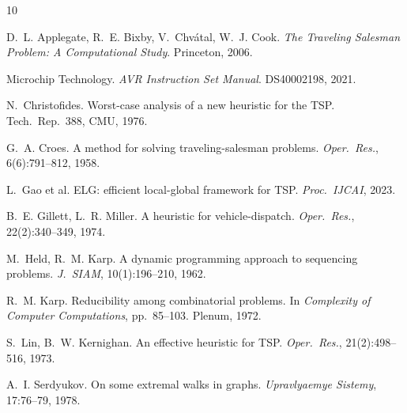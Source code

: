 \documentclass[11pt,a4paper,twocolumn]{article}
\begin{document}

\begin{thebibliography}{10}

D.~L. Applegate, R.~E. Bixby, V.~Chv\'{a}tal, W.~J. Cook.
\textit{The Traveling Salesman Problem: A Computational Study}. Princeton, 2006.

Microchip Technology. \textit{AVR Instruction Set Manual}. DS40002198, 2021.

N.~Christofides. Worst-case analysis of a new heuristic for the TSP.
Tech.\ Rep.\ 388, CMU, 1976.

G.~A. Croes. A method for solving traveling-salesman problems.
\textit{Oper.\ Res.}, 6(6):791--812, 1958.

L.~Gao et al. ELG: efficient local-global framework for TSP.
\textit{Proc.\ IJCAI}, 2023.

B.~E. Gillett, L.~R. Miller. A heuristic for vehicle-dispatch.
\textit{Oper.\ Res.}, 22(2):340--349, 1974.

M.~Held, R.~M. Karp. A dynamic programming approach to sequencing problems.
\textit{J.\ SIAM}, 10(1):196--210, 1962.

R.~M. Karp. Reducibility among combinatorial problems.
In \textit{Complexity of Computer Computations}, pp.~85--103. Plenum, 1972.

S.~Lin, B.~W. Kernighan. An effective heuristic for TSP.
\textit{Oper.\ Res.}, 21(2):498--516, 1973.

A.~I. Serdyukov. On some extremal walks in graphs.
\textit{Upravlyaemye Sistemy}, 17:76--79, 1978.

\end{thebibliography}
\end{document}

